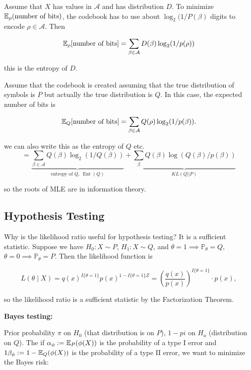 \begin{theorem}

Assume that \(X\) has values in \(\mathcal{A}\) and has distribution \(D\). To minimize \(\E_\rho ( \text{number of bits})\), the codebook has to use about \( \log_2 (1 / P(\beta)\) digits to encode \(\rho \in \mathcal{A}\). Then

\[
\E_\rho [ \text{number of bits}] = \sum_{\beta \in \mathcal{A}} D(\beta) \log_2 (1 / p(\rho)) 
\]

this is the entropy of \(D\).

Assume that the codebook is created assuming that the true distribution of symbols is \(P\) but actually the true distribution is \(Q\). In this case, the expected number of bits is

\[
\E_Q  [ \text{number of bits}] = \sum_{\beta \in \mathcal{A}} Q(\rho) \log_2 (1/ p(\beta)).
\]

we can also write this as the entropy of \(Q\) etc.
\[
= \underbrace{\sum_{\beta \in \mathcal{A}} Q(\beta) \log_2(1 / Q(\beta))}_{\text{entropy of } Q, \ \operatorname{Ent}(Q)} 
+ \underbrace{\sum_\beta Q(\beta) \log (Q(\beta)/ p(\beta)) }_{KL(Q || P)}
\]

so the roots of MLE are in information theory.

\end{theorem}

\subsection{Hypothesis Testing}

Why is the likelihood ratio useful for hypothesis testing? It is a sufficient statistic. Suppose we have \(H_0: X \sim P\), \(H_1: X \sim Q\), and \(\theta = 1 \implies \mathbb{P}_\theta = Q\), \(\theta = 0 \implies \mathbb{P}_\theta = P\). Then the likelihood function is

\[
L(\theta \mid X) = q(x)^{I\{ \theta = 1\}} p(x)^{1 - I\{\theta = 1\}Z} = \left( \frac{q(x)}{p(x)} \right)^{I\{\theta = 1\}} \cdot p(x),
\]

so the likelihood ratio is a sufficient statistic by the Factorization Theorem.

\textbf{Bayes testing:}

Prior probability \(\pi\) on \(H_0\) (that distribution is on \(P\)), \(1-pi\) on \(H_a\) (distribution on \(Q\)). The if \(\alpha_\phi := \E_P (\phi(X))\) is the probability of a type I error and \(1 \beta_\phi := 1 - \E_Q(\phi(X))\) is the probability of a type II error, we want to minimize the Bayes risk:

